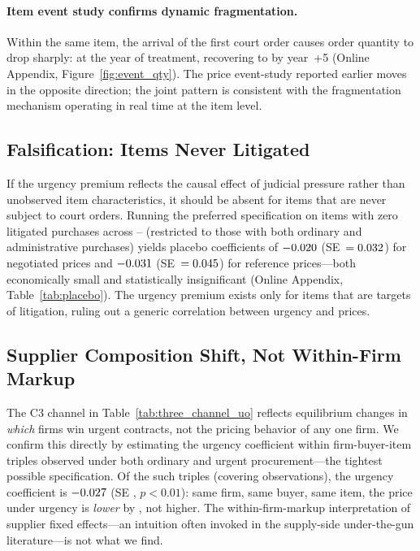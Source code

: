 \paragraph{Item event study confirms dynamic fragmentation.} Within the same item, the arrival of the first court order causes order quantity to drop sharply: \BPeventQtyDropFirstOrder{} at the year of treatment, recovering to \BPeventQtyDropAtFive{} by year~+5 (Online Appendix, Figure~\ref{fig:event_qty}). The price event-study reported earlier moves in the opposite direction; the joint pattern is consistent with the fragmentation mechanism operating in real time at the item level.

\subsection{Falsification: Items Never Litigated}
\label{sec:placebo}

If the urgency premium reflects the causal effect of judicial pressure
rather than unobserved item characteristics, it should be absent for
items that are never subject to court orders. Running the preferred
specification on items with zero litigated purchases across
\BPsampleStartYear--\BPsampleEndYear{}
(restricted to those with both ordinary and administrative purchases)
yields placebo coefficients of $-0.020$ (SE~$= 0.032$) for negotiated
prices and $-0.031$ (SE~$= 0.045$) for reference prices---both
economically small and statistically insignificant (Online Appendix,
Table~\ref{tab:placebo}). The urgency premium exists only for items
that are targets of litigation, ruling out a generic correlation
between urgency and prices.

\subsection{Supplier Composition Shift, Not Within-Firm Markup}
\label{sec:supplier_fe}

The C3 channel in Table~\ref{tab:three_channel_uo} reflects equilibrium changes in \emph{which} firms win urgent contracts, not the pricing behavior of any one firm. We confirm this directly by estimating the urgency coefficient within firm-buyer-item triples observed under both ordinary and urgent procurement---the tightest possible specification. Of the \BPtripleFirmBuyerItemCount{} such triples (covering \BPtripleFirmBuyerItemN{} observations), the urgency coefficient is $-0.027$ (SE \BPtripleFirmBuyerItemSE, $p<0.01$): same firm, same buyer, same item, the price under urgency is \emph{lower} by \BPtripleFirmBuyerItemPct, not higher. The within-firm-markup interpretation of supplier fixed effects---an intuition often invoked in the supply-side under-the-gun literature---is not what we find.

